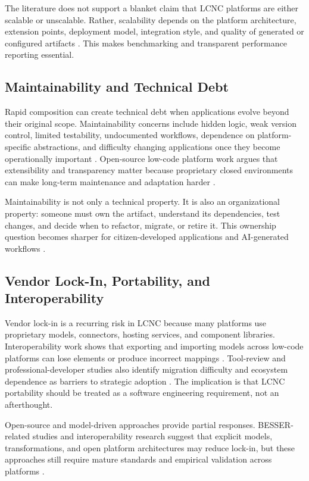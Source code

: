 \documentclass[conference]{IEEEtran}
\begin{document}
The literature does not support a blanket claim that LCNC platforms are either scalable or unscalable. Rather, scalability depends on the platform architecture, extension points, deployment model, integration style, and quality of generated or configured artifacts \cite{p18,p20,p26,p45}. This makes benchmarking and transparent performance reporting essential.

\subsection{Maintainability and Technical Debt}
Rapid composition can create technical debt when applications evolve beyond their original scope. Maintainability concerns include hidden logic, weak version control, limited testability, undocumented workflows, dependence on platform-specific abstractions, and difficulty changing applications once they become operationally important \cite{p14,p29,p30}. Open-source low-code platform work argues that extensibility and transparency matter because proprietary closed environments can make long-term maintenance and adaptation harder \cite{p02,p20}.

Maintainability is not only a technical property. It is also an organizational property: someone must own the artifact, understand its dependencies, test changes, and decide when to refactor, migrate, or retire it. This ownership question becomes sharper for citizen-developed applications and AI-generated workflows \cite{p13,p47,p49}.

\subsection{Vendor Lock-In, Portability, and Interoperability}
Vendor lock-in is a recurring risk in LCNC because many platforms use proprietary models, connectors, hosting services, and component libraries. Interoperability work shows that exporting and importing models across low-code platforms can lose elements or produce incorrect mappings \cite{p34}. Tool-review and professional-developer studies also identify migration difficulty and ecosystem dependence as barriers to strategic adoption \cite{p09,p49}. The implication is that LCNC portability should be treated as a software engineering requirement, not an afterthought.

Open-source and model-driven approaches provide partial responses. BESSER-related studies and interoperability research suggest that explicit models, transformations, and open platform architectures may reduce lock-in, but these approaches still require mature standards and empirical validation across platforms \cite{p02,p20,p34}.
\end{document}
